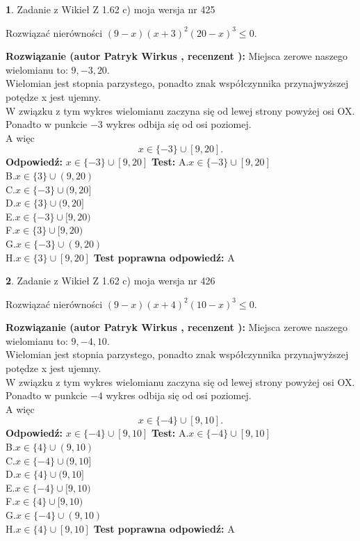 \documentclass[12pt, a4paper]{article}
\theoremstyle{definition} %
\newtheorem{zad}{}
\newcommand{\zadStart}[1]{\begin{zad}#1\newline}
\newcommand{\zadStop}{\end{zad}}
\newcommand{\rozwStart}[2]{\noindent \textbf{Rozwiązanie (autor #1 , recenzent #2): }\newline}
\newcommand{\rozwStop}{\newline}
\newcommand{\odpStart}{\noindent \textbf{Odpowiedź:}\newline}
\newcommand{\odpStop}{\newline}
\newcommand{\testStart}{\noindent \textbf{Test:}\newline}
\newcommand{\testStop}{\newline}
\newcommand{\kluczStart}{\noindent \textbf{Test poprawna odpowiedź:}\newline}
\newcommand{\kluczStop}{\newline}
\begin{document}
\zadStart{Zadanie z Wikieł Z 1.62 c) moja wersja nr 425}

Rozwiązać nierówności $(9-x)(x+3)^{2}(20-x)^{3}\le0$.
\zadStop
\rozwStart{Patryk Wirkus}{}
Miejsca zerowe naszego wielomianu to: $9, -3, 20$.\\
Wielomian jest stopnia parzystego, ponadto znak współczynnika przy\linebreak najwyższej potędze x jest ujemny.\\ W związku z tym wykres wielomianu zaczyna się od lewej strony powyżej osi OX.\\
Ponadto w punkcie $-3$ wykres odbija się od osi poziomej.\\
A więc $$x \in \{-3\} \cup [9,20].$$
\rozwStop
\odpStart
$x \in \{-3\} \cup [9,20]$
\odpStop
\testStart
A.$x \in \{-3\} \cup [9,20]$\\
B.$x \in \{3\} \cup (9,20)$\\
C.$x \in \{-3\} \cup (9,20]$\\
D.$x \in \{3\} \cup (9,20]$\\
E.$x \in \{-3\} \cup [9,20)$\\
F.$x \in \{3\} \cup [9,20)$\\
G.$x \in \{-3\} \cup (9,20)$\\
H.$x \in \{3\} \cup [9,20]$
\testStop
\kluczStart
A
\kluczStop



\zadStart{Zadanie z Wikieł Z 1.62 c) moja wersja nr 426}

Rozwiązać nierówności $(9-x)(x+4)^{2}(10-x)^{3}\le0$.
\zadStop
\rozwStart{Patryk Wirkus}{}
Miejsca zerowe naszego wielomianu to: $9, -4, 10$.\\
Wielomian jest stopnia parzystego, ponadto znak współczynnika przy\linebreak najwyższej potędze x jest ujemny.\\ W związku z tym wykres wielomianu zaczyna się od lewej strony powyżej osi OX.\\
Ponadto w punkcie $-4$ wykres odbija się od osi poziomej.\\
A więc $$x \in \{-4\} \cup [9,10].$$
\rozwStop
\odpStart
$x \in \{-4\} \cup [9,10]$
\odpStop
\testStart
A.$x \in \{-4\} \cup [9,10]$\\
B.$x \in \{4\} \cup (9,10)$\\
C.$x \in \{-4\} \cup (9,10]$\\
D.$x \in \{4\} \cup (9,10]$\\
E.$x \in \{-4\} \cup [9,10)$\\
F.$x \in \{4\} \cup [9,10)$\\
G.$x \in \{-4\} \cup (9,10)$\\
H.$x \in \{4\} \cup [9,10]$
\testStop
\kluczStart
A
\kluczStop
\end{document}
